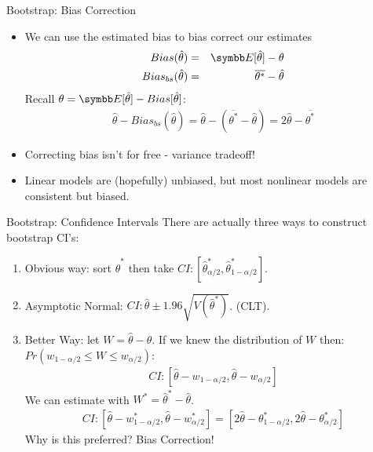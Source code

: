 \documentclass[aspectratio=169,11pt]{beamer}
\begin{document}
\begin{frame}{Bootstrap: Bias Correction}
\begin{itemize}
\item We can use the estimated bias to \alert{bias correct} our estimates
\begin{eqnarray*}
Bias(\hat{\theta}) &=&\E[\hat{\theta}] - \theta \\
Bias_{bs}(\hat{\theta}) &=&\overline{\theta^{*}} -\hat{\theta}
\end{eqnarray*}
Recall $\theta = \E[\hat{\theta}] - Bias[\hat{\theta}]$:
\begin{eqnarray*}
\hat{\theta}- Bias_{bs}(\hat{\theta}) = \hat{\theta}-(\overline{\theta^{*}}-\hat{\theta}) = 2 \hat{\theta} - \overline{\theta^{*}}
\end{eqnarray*}
\item Correcting bias isn't for free - variance tradeoff!
\item Linear models are (hopefully) unbiased, but most nonlinear models are \alert{consistent but biased}.
\end{itemize}

\end{frame}

\begin{frame}{Bootstrap: Confidence Intervals}
There are actually three ways to construct bootstrap CI's:
\begin{enumerate}
\item Obvious way: sort  $\hat{\theta}^{*}$ then take $CI: [\hat{\theta}^{*}_{\alpha/2},\hat{\theta}^{*}_{1-\alpha/2}]$.
\item Asymptotic Normal:  $CI: \hat{\theta} \pm 1.96 \sqrt{V(\hat{\theta}^{*})}$. (CLT).
\item Better Way: let $W= \hat{\theta} -\theta$. If we knew the distribution of $W$ then: $Pr(w_{1-\alpha/2} \leq W \leq w_{\alpha/2})$:
\begin{eqnarray*}
CI: [\hat{\theta} -w_{1-\alpha/2}, \hat{\theta} -w_{\alpha/2}]
\end{eqnarray*}
We can estimate with $W^{*} = \hat{\theta}^{*} - \hat{\theta}$.
\begin{eqnarray*}
CI: [\hat{\theta} -w^*_{1-\alpha/2}, \hat{\theta} -w^*_{\alpha/2}] = [2 \hat{\theta} -\theta^*_{1-\alpha/2}, 2 \hat{\theta} -\theta^*_{\alpha/2}]
\end{eqnarray*}
Why is this preferred? Bias Correction!
\end{enumerate}

\end{frame}
\end{document}
